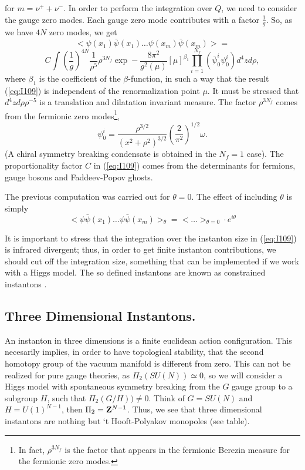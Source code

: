 for $m=\nu^++\nu^-$. In order to perform the integration over
$Q$, we need to consider the gauge zero modes. Each gauge zero
mode contributes with a factor $\frac {1}{g}$. So, as we have
$4N$ zero modes, we get
\[
<\psi(x_1) \bar{\psi}(x_1) \ldots \psi(x_m) \bar{\psi}(x_m)> = \]
\begin{equation}
C \int \left( \frac {1}{g} \right)^{4N} \frac {1}{\rho^5} \rho^{3
N_f} \exp - \frac {8 \pi^2}{g^2(\mu)} [\mu]^{\beta_1} \prod_{i=1}
^{N_f} (\bar{\psi}_0^{i} {\psi}_0^{i}) d^4 z d \rho,
\label{eq:I109}
\end{equation}
where $\beta_1$ is the coefficient of the $\beta$-function, in
such a way that the result (\ref{eq:I109}) is independent of the
renormalization point $\mu$. It must be stressed that $d^4z d\rho
\rho^{-5}$ is a translation and dilatation invariant measure. The
factor $\rho^{3N_f}$ comes from the fermionic zero modes\footnote{In 
fact, $\rho^{3N_f}$ is the factor that appears in the fermionic Berezin 
measure for the fermionic zero modes.},
\begin{equation}
\psi_0^{i} = \frac {\rho^{3/2}}{(x^2+\rho^2)^{3/2}} \left( \frac
{2}{\pi^2} \right)^{1/2} \omega.
\label{eq:I110}
\end{equation}
(A chiral symmetry breaking condensate is obtained in the $N_f=1$
case). The proportionality factor $C$ in (\ref{eq:I109}) comes
from the determinants for fermions, gauge bosons and
Faddeev-Popov ghosts.
  
The previous computation was carried out for $\theta=0$. The
effect of including $\theta$ is simply
\begin{equation}
<\psi \bar{\psi}(x_1) \ldots \psi \bar{\psi}(x_m)>_{\theta} = <
\ldots >_{\theta=0} \cdot e^{i \theta}
\label{eq:I111}
\end{equation}
  
It is important to stress that the integration over the instanton
size in (\ref{eq:I109}) is infrared divergent; thus, in order to
get finite instanton contributions, we should cut off the
integration size, something that can be implemented if we work
with a Higgs model. The so defined instantons are known as
constrained instantons \cite{tHpseudo}.
 

\subsection{Three Dimensional Instantons.}
\label{sec:7}

An instanton in three dimensions is a finite
euclidean action configuration. This necesarily implies, in
order to have topological stability, that the second homotopy
group of the vacuum manifold is different from zero. This can not
be realized for pure gauge theories, as $\Pi_2(SU(N)) \simeq 0$,
so we will consider a Higgs model with spontaneous symmetry
breaking from the $G$ gauge group to a subgroup $H$, such that
$\Pi_2(G/H)) \neq 0$. Think of $G=SU(N)$ and
$H=U(1)^{N-1}$, then $\Pi_2={\bf Z}^{N-1}$. Thus, we see that
three dimensional instantons are nothing but `t Hooft-Polyakov
monopoles (see table).


